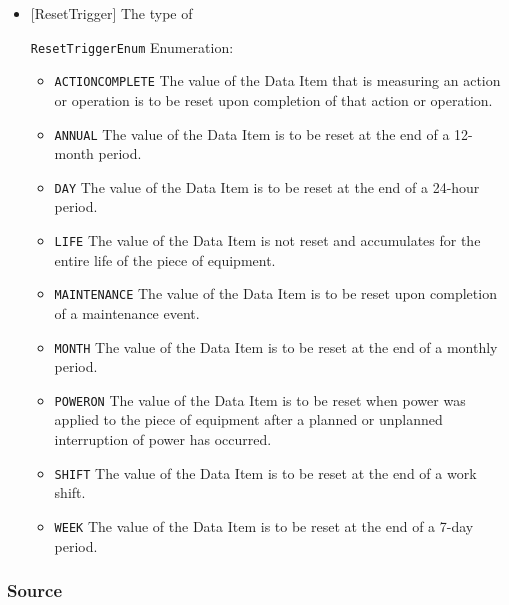 \begin{itemize}

\item {}[ResetTrigger] \newline The type of 

\texttt{ResetTriggerEnum} Enumeration:

\begin{itemize}
\item \texttt{ACTION\textunderscore COMPLETE} \newline The value of the \gls{Data Item} that is measuring an action or operation is to be reset upon completion of that action or operation. 
\item \texttt{ANNUAL} \newline The value of the \gls{Data Item} is to be reset at the end of a 12-month period. 
\item \texttt{DAY} \newline The value of the \gls{Data Item} is to be reset at the end of a 24-hour period. 
\item \texttt{LIFE} \newline The value of the \gls{Data Item} is not reset and accumulates for the entire life of the piece of equipment. 
\item \texttt{MAINTENANCE} \newline The value of the \gls{Data Item} is to be reset upon completion of a maintenance event. 
\item \texttt{MONTH} \newline The value of the \gls{Data Item} is to be reset at the end of a monthly period. 
\item \texttt{POWER\textunderscore ON} \newline The value of the \gls{Data Item} is to be reset when power was applied to the piece of equipment after a planned or unplanned interruption of power has occurred. 
\item \texttt{SHIFT} \newline The value of the \gls{Data Item} is to be reset at the end of a work shift. 
\item \texttt{WEEK} \newline The value of the \gls{Data Item} is to be reset at the end of a 7-day period. 
\end{itemize}

\end{itemize}



\subsubsection{Source}
\label{sec:Source}



